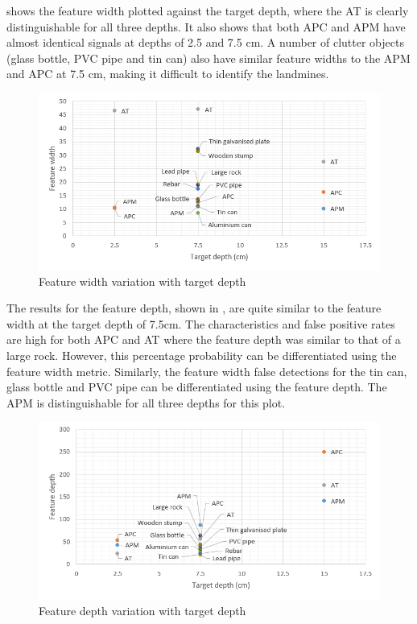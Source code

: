 \documentclass[main.tex]{subfiles}
\begin{document}
 shows the feature width plotted against the target depth, where the AT is clearly distinguishable for all three depths. It also shows that both APC and APM have almost identical signals at depths of 2.5 and 7.5 cm. A number of clutter objects (glass bottle, PVC pipe and tin can) also have similar feature widths to the APM and APC at 7.5 cm, making it difficult to identify the landmines. 

\begin{figure}[ht]
\includegraphics[width=\textwidth]{5-Testing/featureWidth.PNG}
\centering
\caption{Feature width variation with target depth}
\end{figure}

The results for the feature depth, shown in , are quite similar to the feature width at the target depth of 7.5cm. The characteristics and false positive rates are high for both APC and AT where the feature depth was similar to that of a large rock. However, this percentage probability can be differentiated using the feature width metric. Similarly, the feature width false detections for the tin can, glass bottle and PVC pipe can be differentiated using the feature depth. The APM is distinguishable for all three depths for this plot.

\begin{figure}[!ht]
\includegraphics[width=\textwidth]{5-Testing/featureDepth.PNG}
\centering
\caption{Feature depth variation with target depth}
\end{figure}
\end{document}

